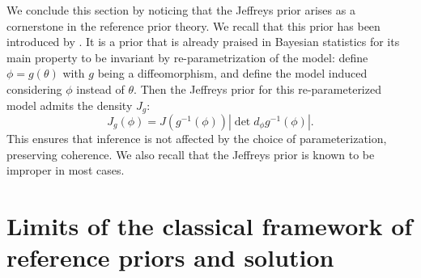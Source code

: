 We conclude this section by noticing that
the Jeffreys prior arises as a cornerstone in the reference prior theory. We recall that
this prior has been introduced by \citet{jeffreys_invariant_1946}. It is a prior that is already praised in Bayesian statistics for its main property to be invariant by re-parametrization of the model:
define $\phi=g(\theta)$ with $g$ being a diffeomorphism, and define the model induced considering $\phi$ instead of $\theta$. Then the Jeffreys prior for this re-parameterized model admits the density $J_g$:
    \begin{equation}
        J_g(\phi) = J(g^{-1}(\phi)) %
        |\det d_\phi g^{-1}(\phi)|.
    \end{equation}
This ensures that inference is not affected by the choice of parameterization, preserving coherence.
We also recall that the Jeffreys prior is known to be improper in most cases.


















\section{Limits of the classical framework of reference priors and solution}\label{sec:intro-refs:limits}



